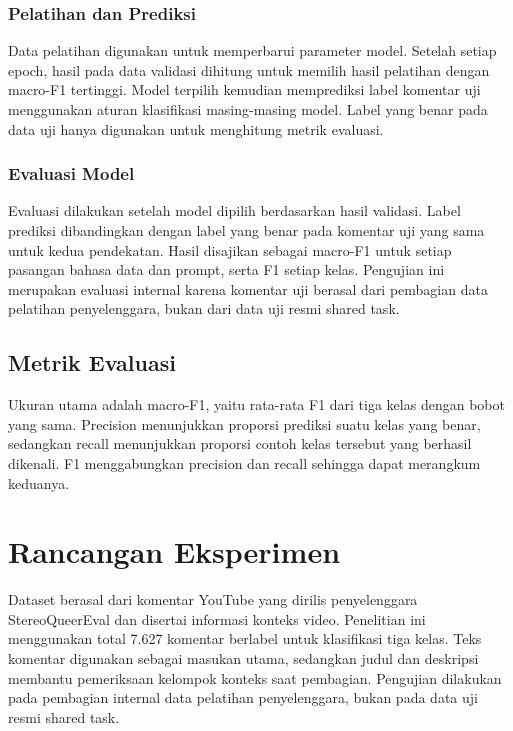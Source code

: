 \documentclass[11pt]{article}
\begin{document}
\subsubsection{Pelatihan dan Prediksi}
Data pelatihan digunakan untuk memperbarui parameter model. Setelah setiap epoch, hasil pada data validasi dihitung untuk memilih hasil pelatihan dengan macro-F1 tertinggi. Model terpilih kemudian memprediksi label komentar uji menggunakan aturan klasifikasi masing-masing model. Label yang benar pada data uji hanya digunakan untuk menghitung metrik evaluasi.

\subsubsection{Evaluasi Model}
Evaluasi dilakukan setelah model dipilih berdasarkan hasil validasi. Label prediksi dibandingkan dengan label yang benar pada komentar uji yang sama untuk kedua pendekatan. Hasil disajikan sebagai macro-F1 untuk setiap pasangan bahasa data dan prompt, serta F1 setiap kelas. Pengujian ini merupakan evaluasi internal karena komentar uji berasal dari pembagian data pelatihan penyelenggara, bukan dari data uji resmi shared task.

\subsection{Metrik Evaluasi}
Ukuran utama adalah macro-F1, yaitu rata-rata F1 dari tiga kelas dengan bobot yang sama. Precision menunjukkan proporsi prediksi suatu kelas yang benar, sedangkan recall menunjukkan proporsi contoh kelas tersebut yang berhasil dikenali. F1 menggabungkan precision dan recall sehingga dapat merangkum keduanya.

\section{Rancangan Eksperimen}
Dataset berasal dari komentar YouTube yang dirilis penyelenggara StereoQueerEval dan disertai informasi konteks video. Penelitian ini menggunakan total 7.627 komentar berlabel untuk klasifikasi tiga kelas. Teks komentar digunakan sebagai masukan utama, sedangkan judul dan deskripsi membantu pemeriksaan kelompok konteks saat pembagian. Pengujian dilakukan pada pembagian internal data pelatihan penyelenggara, bukan pada data uji resmi shared task.
\end{document}
